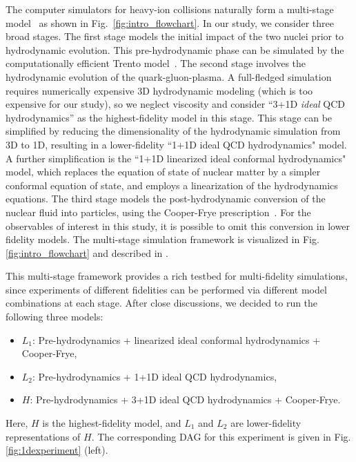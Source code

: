 \documentclass[12pt]{article}
\begin{document}
The computer simulators for heavy-ion collisions naturally form a multi-stage model~\citep{everett2021multisystem} as shown in Fig.~\ref{fig:intro_flowchart}. In our study, we consider three broad stages. The first stage models the initial impact of the two nuclei prior to hydrodynamic evolution. This pre-hydrodynamic phase can be simulated by the computationally efficient Trento model~\citep{Moreland:2014oya}. The second stage involves the hydrodynamic evolution of the quark-gluon-plasma. A full-fledged simulation requires numerically expensive 3D hydrodynamic modeling (which is too expensive for our study), so we neglect viscosity and consider ``3+1D \emph{ideal} QCD hydrodynamics'' as the highest-fidelity model in this stage. This stage can be simplified by reducing the dimensionality of the hydrodynamic simulation from 3D to 1D, resulting in a lower-fidelity ``1+1D ideal QCD hydrodynamics" model. A further simplification is the ``1+1D linearized ideal conformal hydrodynamics" model, which replaces the equation of state of nuclear matter by a simpler conformal equation of state, and employs a linearization of the hydrodynamics equations. The third stage models the post-hydrodynamic conversion of the nuclear fluid into particles, using the Cooper-Frye prescription~\citep{Cooper:1974mv}. For the observables of interest in this study, it is possible to omit this conversion in lower fidelity models. The multi-stage simulation framework is visualized in Fig. \ref{fig:intro_flowchart} and described in \cite{everett2021multisystem}. 

This multi-stage framework provides a rich testbed for multi-fidelity simulations, since experiments of different fidelities can be performed via different model combinations at each stage. After close discussions, we decided to run the following three models:
\begin{itemize}
\itemsep0em 
    \item $L_1$: Pre-hydrodynamics + linearized ideal conformal hydrodynamics + Cooper-Frye,
    \item $L_2$: Pre-hydrodynamics + 1+1D ideal QCD hydrodynamics,
    \item $H$: Pre-hydrodynamics + 3+1D ideal QCD hydrodynamics + Cooper-Frye.
\end{itemize}
Here, $H$ is the highest-fidelity model, and $L_1$ and $L_2$ are lower-fidelity representations of $H$. The corresponding DAG for this experiment is given in Fig. \ref{fig:1dexperiment} (left).
\end{document}
